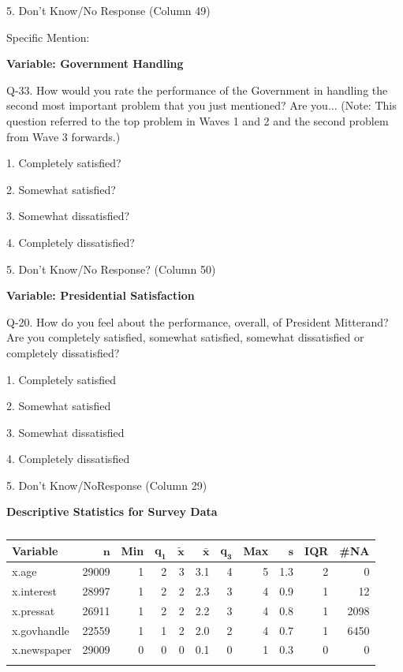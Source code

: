 \documentclass[12pt]{report}
\begin{document}
5. Don\textquoteright{}t Know/No Response (Column 49)

Specific Mention: 


\noindent \textbf{Variable: Government Handling}

\noindent Q-33. How would you rate the performance of the Government in handling
the second most important problem that you just mentioned? Are you...
(Note: This question referred to the top problem in Waves 1 and 2
and the second problem from Wave 3 forwards.)

1. Completely satisfied?

2. Somewhat satisfied?

3. Somewhat dissatisfied?

4. Completely dissatisfied?

5. Don\textquoteright{}t Know/No Response? (Column 50)

\textbf{Variable: Presidential Satisfaction}

\noindent Q-20. How do you feel about the performance, overall, of
President Mitterand? Are you completely satisfied, somewhat satisfied,
somewhat dissatisfied or completely dissatisfied?

1. Completely satisfied

2. Somewhat satisfied

3. Somewhat dissatisfied

4. Completely dissatisfied

5. Don\textquoteright{}t Know/NoResponse (Column 29)

\pagebreak

\textbf{Descriptive Statistics for Survey Data}

\footnotesize
\begin{longtable}{lrrrrrrrrrr}  \textbf{Variable} & $\mathbf{n}$ & \textbf{Min} & $\mathbf{q_1}$ & $\mathbf{\widetilde{x}}$ & $\mathbf{\bar{x}}$ & $\mathbf{q_3}$ & \textbf{Max} & $\mathbf{s}$ & \textbf{IQR} & \textbf{\#NA} \\    \hline x.age & 29009 & 1 & 2 & 3 & 3.1 & 4 & 5 & 1.3 & 2 &    0 \\    x.interest & 28997 & 1 & 2 & 2 & 2.3 & 3 & 4 & 0.9 & 1 &   12 \\    x.pressat & 26911 & 1 & 2 & 2 & 2.2 & 3 & 4 & 0.8 & 1 & 2098 \\    x.govhandle & 22559 & 1 & 1 & 2 & 2.0 & 2 & 4 & 0.7 & 1 & 6450 \\    x.newspaper & 29009 & 0 & 0 & 0 & 0.1 & 0 & 1 & 0.3 & 0 &    0 \\    \hline \caption{} \label{} \end{longtable}
\end{document}
